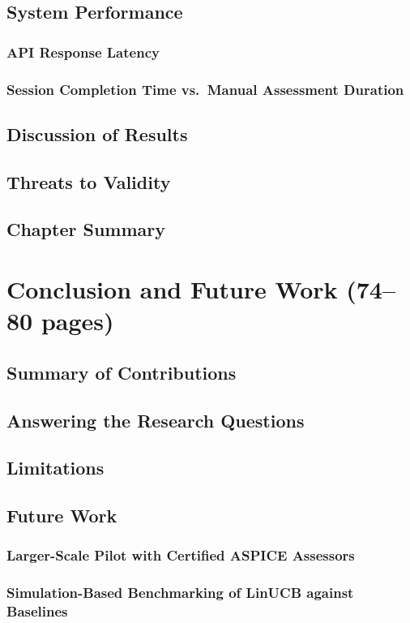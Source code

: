 \documentclass[a4paper, 12pt, oneside, openany, BCOR1cm,toc=chapterentrywithdots]{scrbook}
\begin{document}
\section{System Performance}
\subsection{API Response Latency}
\subsection{Session Completion Time vs.\ Manual Assessment Duration}
\section{Discussion of Results}
\section{Threats to Validity}
\section{Chapter Summary}

\chapter{Conclusion and Future Work (74--80 pages)}
\label{chap:conclusion}
% 
\section{Summary of Contributions}
\section{Answering the Research Questions}
\section{Limitations}
\section{Future Work}
\subsection{Larger-Scale Pilot with Certified ASPICE Assessors}
\subsection{Simulation-Based Benchmarking of LinUCB against Baselines}
\end{document}
